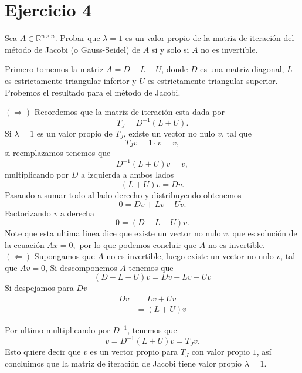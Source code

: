 
\section*{Ejercicio 4}
Sea $A \in \mathbb{R}^{n \times n}$. Probar que $\lambda = 1$ es un valor propio de la matriz de iteración del método de Jacobi (o Gauss-Seidel) de $A$ si y solo si $A$ no es invertible.
\begin{sproof}
    Primero tomemos la matriz $A=D-L-U$, donde $D$ es una matriz diagonal, $L$ es estrictamente triangular inferior y $U$ es estrictamente triangular superior.
       Probemos el resultado para el método de Jacobi.

       $(\Rightarrow)$ Recordemos que la matriz de iteración esta dada por 
       $$T_J=D^{-1}(L+U).$$
       Si $\lambda=1$ es un valor propio de $T_J$, existe un vector no nulo $v$, tal que
       $$T_Jv=1\cdot v=v,$$
       si reemplazamos tenemos que
       $$D^{-1}(L+U)v=v,$$
       multiplicando por $D$ a izquierda a ambos lados
       $$(L+U)v=Dv.$$
       Pasando a sumar todo al lado derecho y distribuyendo obtenemos
       $$0=Dv+Lv+Uv.$$
       Factorizando $v$ a derecha
       $$0=(D-L-U)v.$$
       Note que esta ultima linea dice que existe un vector no nulo $v$, que es solución de la ecuación $Ax=0,$ por lo que podemos concluir que $A$ no es invertible.\\
       $(\Leftarrow)$ Supongamos que $A$ no es invertible, luego existe un vector no nulo $v$, tal que $Av=0$, Si descomponemos $A$ tenemos que
       $$(D-L-U)v=Dv-Lv-Uv$$
       Si despejamos para $Dv$
       \begin{align*}
           Dv&=Lv+Uv\\
           &=(L+U)v
       \end{align*}

       Por ultimo multiplicando por $D^{-1}$, tenemos que
       $$v=D^{-1}(L+U)v=T_Jv.$$
       Esto quiere decir que $v$ es un vector propio para $T_J$ con valor propio $1$, así concluimos que la matriz de iteración de Jacobi tiene valor propio $\lambda=1.$


\end{sproof}

